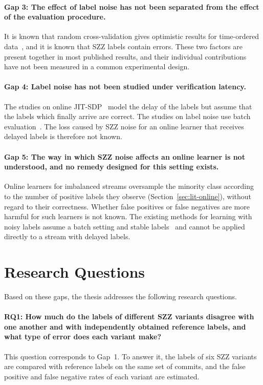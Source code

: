 \documentclass[12pt,a4paper,oneside]{report}
\begin{document}
\paragraph{Gap 3: The effect of label noise has not been separated from the effect
of the evaluation procedure.} It is known that random cross-validation gives
optimistic results for time-ordered
data~\cite{falessi2020order,tan2015online}, and it is known that SZZ labels
contain errors. These two factors are present together in most published
results, and their individual contributions have not been measured in a
common experimental design.

\paragraph{Gap 4: Label noise has not been studied under verification latency.}
The studies on online JIT-SDP~\cite{cabral2019orb,cabral2023reliable} model
the delay of the labels but assume that the labels which finally arrive are
correct. The studies on label noise use batch
evaluation~\cite{kim2011noise,fan2021mislabeled}. The loss caused by SZZ
noise for an online learner that receives delayed labels is therefore not
known.

\paragraph{Gap 5: The way in which SZZ noise affects an online learner is not
understood, and no remedy designed for this setting exists.} Online learners
for imbalanced streams oversample the minority class according to the number
of positive labels they observe (Section~\ref{sec:lit-online}), without
regard to their correctness. Whether false positives or false negatives are
more harmful for such learners is not known. The existing methods for
learning with noisy labels assume a batch setting and stable
labels~\cite{natarajan2013noisy,northcutt2021confident} and cannot be applied
directly to a stream with delayed labels.

\section{Research Questions}

Based on these gaps, the thesis addresses the following research questions.

\paragraph{RQ1: How much do the labels of different SZZ variants disagree with one
another and with independently obtained reference labels, and what type of
error does each variant make?}
This question corresponds to Gap~1. To answer it, the labels of six SZZ
variants are compared with reference labels on the same set of commits, and
the false positive and false negative rates of each variant are estimated.
\end{document}
